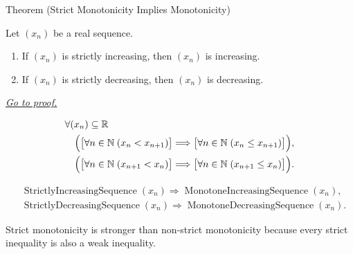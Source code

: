 
\begin{theorembox}{Theorem (Strict Monotonicity Implies Monotonicity)}
\begin{theorem}
\label{thm:strict-monotonicity-implies-monotonicity}
Let $(x_n)$ be a real sequence.
\begin{enumerate}[label=(\alph*)]
  \item If $(x_n)$ is strictly increasing, then $(x_n)$ is increasing.
  \item If $(x_n)$ is strictly decreasing, then $(x_n)$ is decreasing.
\end{enumerate}

\smallskip
\noindent
\hyperref[prf:strict-monotonicity-implies-monotonicity]{\textit{Go to proof.}}
\end{theorem}
\end{theorembox}

\begin{remark*}
\[
\begin{aligned}
&\forall (x_n)\subseteq\mathbb{R}\\
&\quad\Bigl(
  \bigl[\forall n\in\mathbb{N}\;(x_n<x_{n+1})\bigr]
  \Longrightarrow
  \bigl[\forall n\in\mathbb{N}\;(x_n\le x_{n+1})\bigr]
\Bigr),\\
&\quad\Bigl(
  \bigl[\forall n\in\mathbb{N}\;(x_{n+1}<x_n)\bigr]
  \Longrightarrow
  \bigl[\forall n\in\mathbb{N}\;(x_{n+1}\le x_n)\bigr]
\Bigr).
\end{aligned}
\]
\end{remark*}

\begin{remark*}
\[
\begin{aligned}
&\operatorname{StrictlyIncreasingSequence}(x_n)
\Longrightarrow
\operatorname{MonotoneIncreasingSequence}(x_n),\\
&\operatorname{StrictlyDecreasingSequence}(x_n)
\Longrightarrow
\operatorname{MonotoneDecreasingSequence}(x_n).
\end{aligned}
\]
\end{remark*}

\begin{remark*}[Interpretation]
Strict monotonicity is stronger than non-strict monotonicity because every
strict inequality is also a weak inequality.
\end{remark*}

